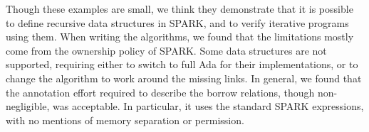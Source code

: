 \documentclass[runningheads]{llncs}
\begin{document}
Though these examples are small, we think they demonstrate that it is possible to define recursive data structures in SPARK, and to verify iterative programs using them. When writing the algorithms, we found that the limitations mostly come from the ownership policy of SPARK. Some data structures are not supported, requiring either to switch to full Ada for their implementations, or to change the algorithm to work around the missing links. %
%
%
In general, we found that the annotation effort required to describe the borrow relations, though non-negligible, was acceptable.
In particular, it uses the standard SPARK expressions, with no mentions of memory separation or permission.
\end{document}

